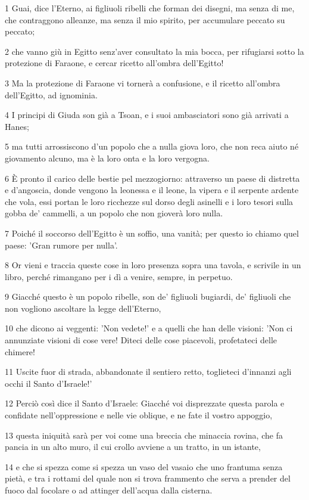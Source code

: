 \par 1 Guai, dice l'Eterno, ai figliuoli ribelli che forman dei disegni, ma senza di me, che contraggono alleanze, ma senza il mio spirito, per accumulare peccato su peccato;
\par 2 che vanno giù in Egitto senz'aver consultato la mia bocca, per rifugiarsi sotto la protezione di Faraone, e cercar ricetto all'ombra dell'Egitto!
\par 3 Ma la protezione di Faraone vi tornerà a confusione, e il ricetto all'ombra dell'Egitto, ad ignominia.
\par 4 I principi di Giuda son già a Tsoan, e i suoi ambasciatori sono già arrivati a Hanes;
\par 5 ma tutti arrossiscono d'un popolo che a nulla giova loro, che non reca aiuto né giovamento alcuno, ma è la loro onta e la loro vergogna.
\par 6 È pronto il carico delle bestie pel mezzogiorno: attraverso un paese di distretta e d'angoscia, donde vengono la leonessa e il leone, la vipera e il serpente ardente che vola, essi portan le loro ricchezze sul dorso degli asinelli e i loro tesori sulla gobba de' cammelli, a un popolo che non gioverà loro nulla.
\par 7 Poiché il soccorso dell'Egitto è un soffio, una vanità; per questo io chiamo quel paese: 'Gran rumore per nulla'.
\par 8 Or vieni e traccia queste cose in loro presenza sopra una tavola, e scrivile in un libro, perché rimangano per i dì a venire, sempre, in perpetuo.
\par 9 Giacché questo è un popolo ribelle, son de' figliuoli bugiardi, de' figliuoli che non vogliono ascoltare la legge dell'Eterno,
\par 10 che dicono ai veggenti: 'Non vedete!' e a quelli che han delle visioni: 'Non ci annunziate visioni di cose vere! Diteci delle cose piacevoli, profetateci delle chimere!
\par 11 Uscite fuor di strada, abbandonate il sentiero retto, toglieteci d'innanzi agli occhi il Santo d'Israele!'
\par 12 Perciò così dice il Santo d'Israele: Giacché voi disprezzate questa parola e confidate nell'oppressione e nelle vie oblique, e ne fate il vostro appoggio,
\par 13 questa iniquità sarà per voi come una breccia che minaccia rovina, che fa pancia in un alto muro, il cui crollo avviene a un tratto, in un istante,
\par 14 e che si spezza come si spezza un vaso del vasaio che uno frantuma senza pietà, e tra i rottami del quale non si trova frammento che serva a prender del fuoco dal focolare o ad attinger dell'acqua dalla cisterna.

